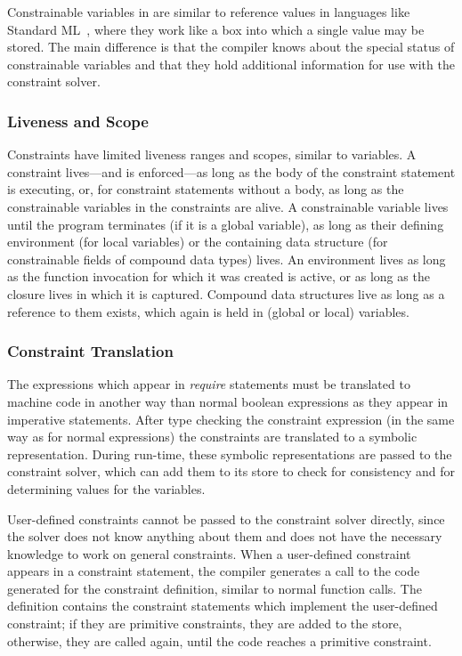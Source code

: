 Constrainable variables in \turtle{} are similar to reference values
in languages like Standard ML~\cite{milner97sml}, where they work like
a box into which a single value may be stored.  The main difference is
that the compiler knows about the special status of constrainable
variables and that they hold additional information for use with the
constraint solver.


\subsubsection{Liveness and Scope}
\label{sec:liveness-scoping}

Constraints have limited liveness ranges and scopes, similar to
variables.  A constraint lives---and is enforced---as long as the
body of the constraint statement is executing, or, for constraint
statements without a body, as long as the constrainable variables in
the constraints are alive.  A constrainable variable lives until the
program terminates (if it is a global variable), as long as their
defining environment (for local variables) or the containing data
structure (for constrainable fields of compound data types) lives.  An
environment lives as long as the function invocation for which it was
created is active, or as long as the closure lives in which it is
captured.  Compound data structures live as long as a reference to
them exists, which again is held in (global or local) variables.


\subsubsection{Constraint Translation}
\label{sec:constraint-translation}


The expressions which appear in {\em require} statements must be
translated to machine code in another way than normal boolean
expressions as they appear in imperative statements.  After type
checking the constraint expression (in the same way as for normal
expressions) the constraints are translated to a symbolic
representation.  During run-time, these symbolic representations are
passed to the constraint solver, which can add them to its store to
check for consistency and for determining values for the variables.


User-defined constraints cannot be passed to the constraint solver
directly, since the solver does not know anything about them and does
not have the necessary knowledge to work on general constraints.  When
a user-defined constraint appears in a constraint statement, the
compiler generates a call to the code generated for the constraint
definition, similar to normal function calls.  The definition contains
the constraint statements which implement the user-defined constraint;
if they are primitive constraints, they are added to the store,
otherwise, they are called again, until the code reaches a primitive
constraint.


